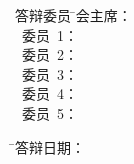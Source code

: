 \vspace{8mm}

\begin{tabbing}
\hspace{5mm}\Songti\sihao 答辩委员 \hspace{-2.6mm} \= \Songti\sihao 会主席： \= \underline{\makebox[9cm]{\sihao\zjucommitteemainc}} \\
          \>    \Songti\sihao~委员~1： \> \underline{\makebox[9cm]{\sihao\zjucommitteeonec}} \\
          \>    \Songti\sihao~委员~2： \> \underline{\makebox[9cm]{\sihao\zjucommitteetwoc}} \\
          \>    \Songti\sihao~委员~3： \> \underline{\makebox[9cm]{\sihao\zjucommitteethreec}} \\
          \>    \Songti\sihao~委员~4： \> \underline{\makebox[9cm]{\sihao\zjucommitteefourc}} \\
          \>    \Songti\sihao~委员~5： \> \underline{\makebox[9cm]{\sihao\zjucommitteefivec}}
\end{tabbing}

\vspace{8mm}

\begin{tabbing}
\hspace{34mm} \= \Songti\sihao 答辩日期： \= \underline{\makebox[5cm]{\Songti\sihao\zjudefencedatec}} \\
\end{tabbing}

